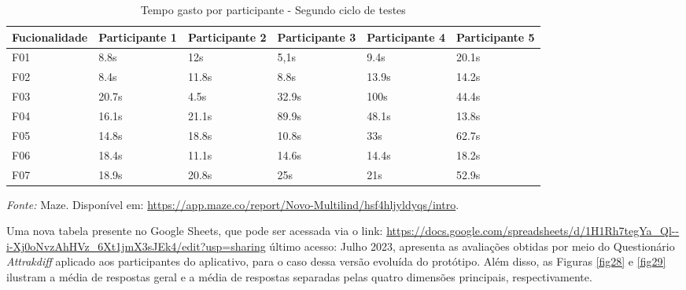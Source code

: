 \begin{table}[h!]
	\centering
	\caption{Tempo gasto por participante - Segundo ciclo de testes}
	\label{tab07}
	\begin{adjustbox}{center}
	\begin{tabular}{l|l|l|l|l|l}
	\hline
	Fucionalidade & Participante 1 & Participante 2 & Participante 3 & Participante 4 & Participante 5 \\ 	\hline
	F01                   & 8.8s     & 12s     & 5,1s      & 9.4s       & 20.1s      \\
	F02                   & 8.4s        & 11.8s      & 8.8s      & 13.9s    & 14.2s     \\
	F03                   & 20.7s        & 4.5s      & 32.9s      & 100s     & 44.4s     \\
	F04                   & 16.1s        & 21.1s     & 89.9s     & 48.1s     & 13.8s     \\
	F05                   & 14.8s      & 18.8s      & 10.8s     & 33s     & 62.7s     \\
	F06                   & 18.4s     & 11.1s      & 14.6s     & 14.4s     & 18.2s     \\
	F07                   & 18.9s     & 20.8s      & 25s     & 21s    & 52.9s       \\ 	\hline
	\end{tabular}
	\end{adjustbox}
	\begin{tablenotes}[flushleft]
		\centering
		\item \textit{Fonte:} Maze. Disponível em: \url{https://app.maze.co/report/Novo-Multilind/hsf4hljyldyqs/intro}.
	  \end{tablenotes}
\end{table}

Uma nova tabela presente no Google Sheets, que pode ser acessada via o link: 
\url{https://docs.google.com/spreadsheets/d/1H1Rh7tegYa_Ql--i-Xj0oNvzAhHVz_6Xt1jmX3sJEk4/edit?usp=sharing} último acesso: Julho 2023, apresenta as avaliações obtidas por meio do Questionário \textit{Attrakdiff} aplicado aos participantes do aplicativo, para o caso 
dessa versão evoluída do protótipo. Além disso, as Figuras \ref{fig28} e \ref{fig29} ilustram a média de respostas geral e a média de respostas separadas pelas quatro dimensões principais, respectivamente.

